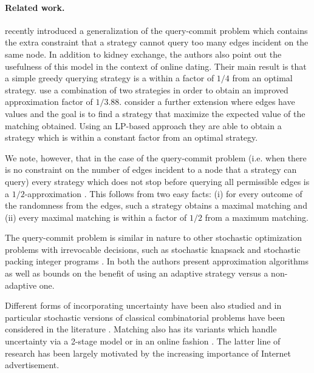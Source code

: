 \documentclass[12pt]{article}
\begin{document}
		
		\paragraph{Related work.} \cite{chen} recently introduced a generalization of the query-commit problem which contains the extra constraint that a strategy cannot query too many edges incident on the same node. In addition to kidney exchange, the authors also point out the usefulness of this model in the context of online dating. Their main result is that a simple greedy querying strategy is a within a factor of $1/4$ from an optimal strategy. \cite{mestre} use a combination of two strategies in order to obtain an improved approximation factor of $1/3.88$. \cite{viswanath} consider a further extension where edges have values and the goal is to find a strategy that maximize the expected value of the matching obtained. Using an LP-based approach they are able to obtain a strategy which is within a constant factor from an optimal strategy.
		
		We note, however, that in the case of the query-commit problem (i.e. when there is no constraint on the number of edges incident to a node that a strategy can query) every strategy which does not stop before querying all permissible edges is a $1/2$-approximation \cite{chen}. This follows from two easy facts: (i) for every outcome of the randomness from the edges, such a strategy obtains a maximal matching and (ii) every maximal matching is within a factor of $1/2$ from a maximum matching. 
		
		The query-commit problem is similar in nature to other stochastic optimization problems with irrevocable decisions, such as stochastic knapsack \cite{goemansKnapsack} and stochastic packing integer programs \cite{goemansIP}. In both \cite{goemansKnapsack, goemansIP} the authors present approximation algorithms as well as bounds on the benefit of using an adaptive strategy versus a non-adaptive one. 
		
		Different forms of incorporating uncertainty have been also studied \cite{SP} and in particular stochastic versions of classical combinatorial problems have been considered in the literature \cite{covering,paths}. Matching also has its variants which handle uncertainty via a 2-stage model \cite{katriel} or in an online fashion \cite{onlinePD, onlineMatching, goel, KVV, unreliable, vazirani}. The latter line of research has been largely motivated by the increasing importance of Internet advertisement.  
		
\end{document}
